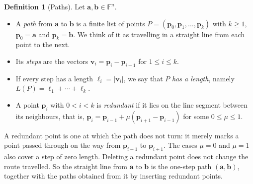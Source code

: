 \documentclass[11pt]{article}
\theoremstyle{plain}
\theoremstyle{definition}
\newtheorem{definition}[theorem]{Definition}
\theoremstyle{remark}
\begin{document}
\begin{definition}[Paths]\label{def:path}
Let $\mathbf{a}, \mathbf{b} \in \mathbb{F}^n$.
\begin{itemize}
    \item A \emph{path} from $\mathbf{a}$ to $\mathbf{b}$ is a finite list of points $P = (\mathbf{p}_0, \mathbf{p}_1, \dots, \mathbf{p}_k)$ with $k \geq 1$, $\mathbf{p}_0 = \mathbf{a}$ and $\mathbf{p}_k = \mathbf{b}$. We think of it as travelling in a straight line from each point to the next.
    \item Its \emph{steps} are the vectors $\mathbf{v}_i = \mathbf{p}_i - \mathbf{p}_{i-1}$ for $1 \leq i \leq k$.
    \item If every step has a length $\ell_i = |\mathbf{v}_i|$, we say that $P$ \emph{has a length}, namely $L(P) = \ell_1 + \cdots + \ell_k$.
    \item A point $\mathbf{p}_i$ with $0 < i < k$ is \emph{redundant} if it lies on the line segment between its neighbours, that is, $\mathbf{p}_i = \mathbf{p}_{i-1} + \mu (\mathbf{p}_{i+1} - \mathbf{p}_{i-1})$ for some $0 \leq \mu \leq 1$.
\end{itemize}
\end{definition}

A redundant point is one at which the path does not turn: it merely marks a point passed through on the way from $\mathbf{p}_{i-1}$ to $\mathbf{p}_{i+1}$. The cases $\mu = 0$ and $\mu = 1$ also cover a step of zero length. Deleting a redundant point does not change the route travelled. So the straight line from $\mathbf{a}$ to $\mathbf{b}$ is the one-step path $(\mathbf{a}, \mathbf{b})$, together with the paths obtained from it by inserting redundant points.
\end{document}
